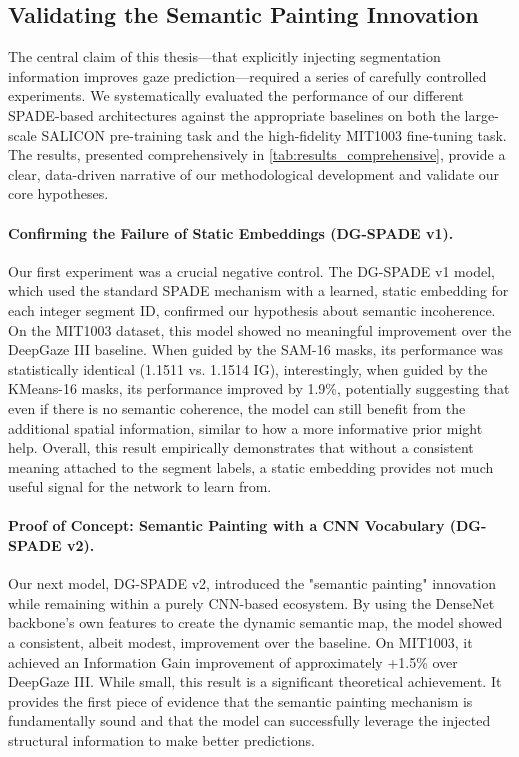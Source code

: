 \subsection{Validating the Semantic Painting Innovation}
\label{sec:method_validation_of_innovation}
The central claim of this thesis—that explicitly injecting segmentation information improves gaze prediction—required a series of carefully controlled experiments. We systematically evaluated the performance of our different SPADE-based architectures against the appropriate baselines on both the large-scale SALICON pre-training task and the high-fidelity MIT1003 fine-tuning task. The results, presented comprehensively in \cref{tab:results_comprehensive}, provide a clear, data-driven narrative of our methodological development and validate our core hypotheses.
\paragraph{Confirming the Failure of Static Embeddings (DG-SPADE v1).}
Our first experiment was a crucial negative control. The DG-SPADE v1 model, which used the standard SPADE mechanism with a learned, static embedding for each integer segment ID, confirmed our hypothesis about semantic incoherence. On the MIT1003 dataset, this model showed no meaningful improvement over the DeepGaze III baseline. When guided by the SAM-16 masks, its performance was statistically identical (1.1511 vs. 1.1514 IG), interestingly, when guided by the KMeans-16 masks, its performance improved by  1.9\%, potentially suggesting that even if there is no semantic coherence, the model can still benefit from the additional spatial information, similar to how a more informative prior might help. Overall, this result empirically demonstrates that without a consistent meaning attached to the segment labels, a static embedding provides not much useful signal for the network to learn from.
\paragraph{Proof of Concept: Semantic Painting with a CNN Vocabulary (DG-SPADE v2).}
Our next model, DG-SPADE v2, introduced the "semantic painting" innovation while remaining within a purely CNN-based ecosystem. By using the DenseNet backbone's own features to create the dynamic semantic map, the model showed a consistent, albeit modest, improvement over the baseline. On MIT1003, it achieved an Information Gain improvement of approximately +1.5\% over DeepGaze III. While small, this result is a significant theoretical achievement. It provides the first piece of evidence that the semantic painting mechanism is fundamentally sound and that the model can successfully leverage the injected structural information to make better predictions.
